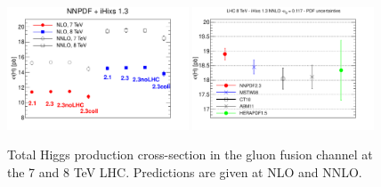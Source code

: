 \begin{figure}[ht]
\centering
\includegraphics[width=0.48\textwidth]{6-LHCimpact/figs/h.pdf}
\includegraphics[width=0.48\textwidth]{6-LHCimpact/figs/h8-as0117.pdf}
\caption[Predictions for the total Higgs production cross-section in the gluon fusion channel at the 7 and 8 TeV LHC]{Total Higgs production cross-section in the gluon fusion channel at the 7 and 8 TeV LHC. Predictions are given at NLO and NNLO.}
\label{fig:totalxsecHiggs}
\end{figure}




